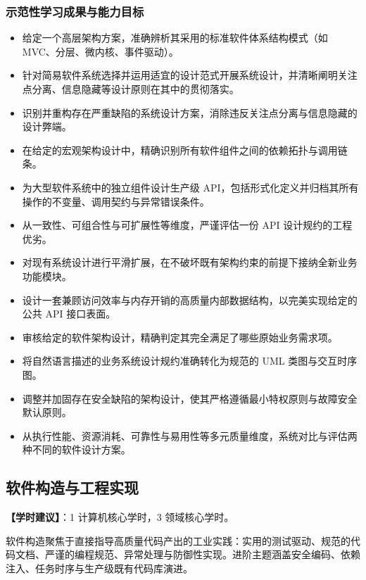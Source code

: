 \subsubsection{示范性学习成果与能力目标}
\begin{itemize}
    \item 给定一个高层架构方案，准确辨析其采用的标准软件体系结构模式（如 MVC、分层、微内核、事件驱动）。
    \item 针对简易软件系统选择并运用适宜的设计范式开展系统设计，并清晰阐明关注点分离、信息隐藏等设计原则在其中的贯彻落实。
    \item 识别并重构存在严重缺陷的系统设计方案，消除违反关注点分离与信息隐藏的设计弊端。
    \item 在给定的宏观架构设计中，精确识别所有软件组件之间的依赖拓扑与调用链条。
    \item 为大型软件系统中的独立组件设计生产级 API，包括形式化定义并归档其所有操作的不变量、调用契约与异常错误条件。
    \item 从一致性、可组合性与可扩展性等维度，严谨评估一份 API 设计规约的工程优劣。
    \item 对现有系统设计进行平滑扩展，在不破坏既有架构约束的前提下接纳全新业务功能模块。
    \item 设计一套兼顾访问效率与内存开销的高质量内部数据结构，以完美实现给定的公共 API 接口表面。
    \item 审核给定的软件架构设计，精确判定其完全满足了哪些原始业务需求项。
    \item 将自然语言描述的业务系统设计规约准确转化为规范的 UML 类图与交互时序图。
    \item 调整并加固存在安全缺陷的架构设计，使其严格遵循最小特权原则与故障安全默认原则。
    \item 从执行性能、资源消耗、可靠性与易用性等多元质量维度，系统对比与评估两种不同的软件设计方案。
\end{itemize}

\subsection{软件构造与工程实现}
\textbf{【学时建议】}：1 计算机核心学时，3 领域核心学时。

软件构造聚焦于直接指导高质量代码产出的工业实践：实用的测试驱动、规范的代码文档、严谨的编程规范、异常处理与防御性实现。进阶主题涵盖安全编码、依赖注入、任务时序与生产级既有代码库演进。

